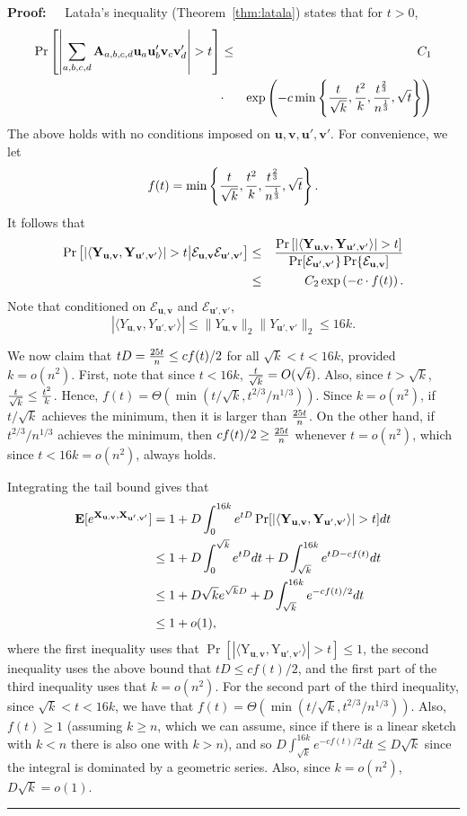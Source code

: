 \documentclass[11pt]{article}
\newenvironment{proof}{\begin{trivlist} \item {\bf Proof:~~}}
  {\qed\end{trivlist}}
\newcommand{\mat}[1]{{\ensuremath{\bm{\mathrm{#1}}}}}
\def\u{{\mathbf u}}
\def\ve{{\mathbf v}}
\def\matA{\mat{A}}
\def\matX{\mat{X}}
\def\matY{\mat{Y}}
\def\frac#1#2{{#1\over #2}}
\def\qed{\hfill\rule{2mm}{2mm}}
\begin{document}
\begin{proof}
Lata{\l}a's inequality (Theorem~\ref{thm:latala}) states that for $t > 0$, 
\begin{eqnarray*}
\Pr\left [\left|\sum_{a,b,c,d} \matA_{a,b,c,d}\u_a\u_b'\ve_c\ve_d'\right| > t\right ] & \leq & C_1\\
& \cdot & \exp\left(-c\min\left\{\frac{t}{\sqrt k},\frac{t^2}{k},\frac{t^\frac23}{n^\frac13},\sqrt{t}\right\}\right)
\end{eqnarray*}
The above holds with no conditions imposed on $\u,\ve,\u',\ve'$. For convenience, we let 
$$f(t) = \min\left\{\frac{t}{\sqrt k},\frac{t^2}{k},\frac{t^\frac23}{n^\frac13},\sqrt{t}\right\}.$$
It follows that
\begin{eqnarray*}
\Pr\left [|\langle \matY_{\u,\ve},\matY_{\u',\ve'}\rangle| > t \big| \mathcal{E}_{\u,\ve}\mathcal{E}_{\u',\ve'}\right ]
& \leq &  
\frac{\Pr\left [|\langle \matY_{\u,\ve},\matY_{\u',\ve'} \rangle| > t\right ]}{\Pr [\mathcal{E}_{\u',\ve'}\}\Pr\{\mathcal{E}_{\u,\ve} ]}\\
& \leq & C_2 \exp\left(-c\cdot f(t) \right).\end{eqnarray*}
Note that conditioned on $\mathcal{E}_{\u,\ve}$ and $\mathcal{E}_{\u',\ve'}$,
\[
|\langle Y_{\u,\ve},Y_{\u',\ve'}\rangle| \leq \|Y_{\u,\ve}\|_2\|Y_{\u',\ve'}\|_2\leq 16k.
\]

We now claim that $tD = \frac{25t}{n} \leq c f(t) /2$ for all $\sqrt{k} < t < 16k$, provided $k = o(n^2)$. First, note
that since $t < 16k$, $\frac{t}{\sqrt{k}} = O(\sqrt{t})$. Also, since $t > \sqrt{k}$, $\frac{t}{\sqrt{k}} \leq \frac{t^2}{k}$. 
Hence, $f(t) = \Theta(\min(t/\sqrt{k}, t^{2/3}/n^{1/3}))$. Since $k = o(n^2)$, if $t/\sqrt{k}$ achieves the minimum, then it is larger
than $\frac{25t}{n}$. On the other hand, if $t^{2/3}/n^{1/3}$ achieves the minimum, then $c f(t)/2 \geq \frac{25t}{n}$ whenever
$t = o(n^2)$, which since $t < 16k = o(n^2)$, always holds. 

Integrating the tail bound gives that
\begin{align*}
{\bf E}[e^{\matX_{\u,\ve},\matX_{\u',\ve'}}] &= 1 + D\int_0^{16k}e^{tD}\Pr[|\langle \matY_{\u,\ve},\matY_{\u',\ve'}\rangle | > t]dt\\
&\leq 1 + D\int_{0}^{\sqrt{k}}e^{tD}dt + D\int_{\sqrt{k}}^{16k}e^{tD - cf(t)}dt\\
&\leq 1 + D\sqrt{k}e^{\sqrt{k}D} + D\int_{\sqrt{k}}^{16k} e^{-cf(t)/2}dt\\
& \leq 1 + o(1),
\end{align*}
where the first inequality uses that $\Pr[|\langle \matY_{\u,\ve},\matY_{\u',\ve'}\rangle | > t] \leq 1$, the second
inequality uses the above bound that $tD \leq cf(t)/2$, and the first part of the third inequality uses that $k = o(n^2)$. For
the second part of the third inequality, since $\sqrt{k} < t < 16k$, we have that $f(t) = \Theta(\min(t/\sqrt{k}, t^{2/3}/n^{1/3}))$. Also, 
$f(t) \geq 1$ (assuming $k \geq n$, which we can assume, since if there is a linear sketch with $k < n$ 
there is also one with $k > n$), and so $D \int_{\sqrt{k}}^{16k} e^{-cf(t)/2}dt \leq D \sqrt{k}$ since the integral is dominated by a geometric
series. Also, since $k = o(n^2)$, $D\sqrt{k} = o(1)$. 


\end{proof}
\end{document}
